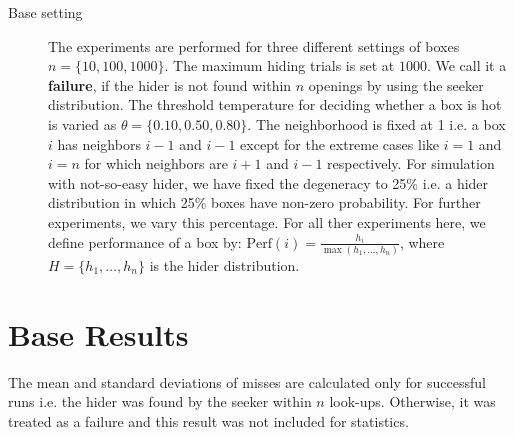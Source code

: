 \documentclass[11pt,a4paper,draft]{article}
\begin{document}
\noindent
\begin{description}
	\item[Base setting] The experiments are performed for three different settings of boxes $n = \{10, 100, 1000\}$. The maximum hiding trials is set at $1000$. We call it a \textbf{failure}, if the hider is not found within $n$ openings by using the seeker distribution. The threshold temperature for deciding whether a box is hot is varied as $\theta = \{0.10, 0.50, 0.80\}$. The neighborhood is fixed at 1 i.e. a box $i$ has neighbors $i-1$ and $i-1$ except for the extreme cases like $i=1$ and $i=n$ for which neighbors are $i+1$ and $i-1$ respectively. For simulation with not-so-easy hider, we have fixed the degeneracy to 25\% i.e.  a hider distribution in which 25\% boxes have non-zero probability. For further experiments, we vary this percentage. For all ther experiments here, we define performance of a box by: $\text{Perf}(i) = \frac{h_i}{\max(h_1,\ldots, h_n)}$, where $H = \{h_1,\ldots, h_n\}$ is the hider distribution. 
	\label{setting:base}
\end{description}


\section{Base Results}

The mean and standard deviations of misses are calculated only for successful runs i.e. the hider was found by the seeker within $n$ look-ups. Otherwise, it was treated as a failure and this result was not included for statistics.
\end{document}
